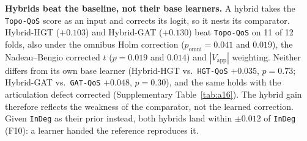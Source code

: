 \noindent\textbf{Hybrids beat the baseline, not their base learners.} A hybrid takes the \texttt{Topo-QoS} score as an input and corrects its logit, so it nests its comparator. Hybrid-HGT ($+0.103$) and Hybrid-GAT ($+0.130$) beat \texttt{Topo-QoS} on 11 of 12 folds, also under the omnibus Holm correction ($p_{\text{omni}} = 0.041$ and $0.019$), the Nadeau--Bengio corrected $t$ ($p = 0.019$ and $0.014$) and $|V_{\text{app}}|$ weighting. Neither differs from its own base learner (Hybrid-HGT vs.\ \texttt{HGT-QoS} $+0.035$, $p = 0.73$; Hybrid-GAT vs.\ \texttt{GAT-QoS} $+0.048$, $p = 0.30$), and the same holds with the articulation defect corrected (Supplementary Table~\ref{tab:a16}). The hybrid gain therefore reflects the weakness of the comparator, not the learned correction. Given \texttt{InDeg} as their prior instead, both hybrids land within $\pm 0.012$ of \texttt{InDeg} (F10): a learner handed the reference reproduces it.


